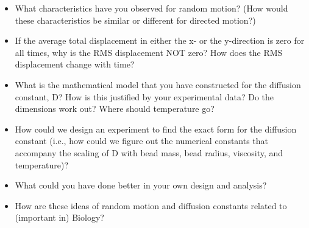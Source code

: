 \begin{enumerate}
\begin{itemize}
\item What characteristics have you observed for random motion? (How would these characteristics be similar or different for directed motion?)
\item If the average total displacement in either the x- or the y-direction is zero for all times, why is the RMS displacement NOT zero? How does the RMS displacement change with time?
\item What is the mathematical model that you have constructed for the diffusion constant, D? How is this justified by your experimental data? Do the dimensions work out? Where should temperature go?
\item How could we design an experiment to find the exact form for the diffusion constant (i.e., how could we figure out the numerical constants that accompany the scaling of D with bead mass, bead radius, viscosity, and temperature)?
\item What could you have done better in your own design and analysis?
\item How are these ideas of random motion and diffusion constants related to (important in) Biology?
\end{itemize}
\end{enumerate}